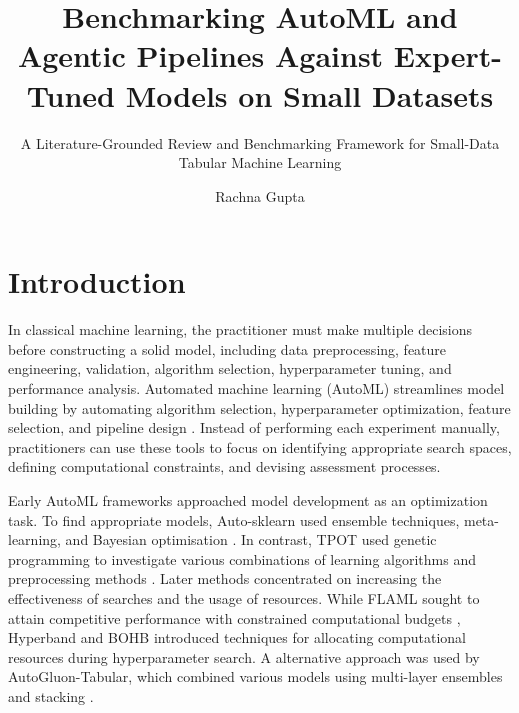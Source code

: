 \documentclass[acmsmall,screen]{acmart}
\title{Benchmarking AutoML and Agentic Pipelines Against Expert-Tuned Models on Small Datasets}
\subtitle{A Literature-Grounded Review and Benchmarking Framework for Small-Data Tabular Machine Learning}
\author{Rachna Gupta}
\affiliation{\institution{AI Tools for Research}\city{Prayagraj}\country{India}}
\begin{document}
\maketitle

\section{Introduction}\label{sec:intro}



In classical machine learning, the practitioner must make multiple decisions before constructing a solid model, including data preprocessing, feature engineering, validation, algorithm selection, hyperparameter tuning, and performance analysis. Automated machine learning (AutoML) streamlines model building by automating algorithm selection, hyperparameter optimization, feature selection, and pipeline design \cite{feurer2015,olson2016}. Instead of performing each experiment manually, practitioners can use these tools to focus on identifying appropriate search spaces, defining computational constraints, and devising assessment processes.


Early AutoML frameworks approached model development as an optimization task. To find appropriate models, Auto-sklearn used ensemble techniques, meta-learning, and Bayesian optimisation \cite{feurer2015}. In contrast, TPOT used genetic programming to investigate various combinations of learning algorithms and preprocessing methods \cite{olson2016}. Later methods concentrated on increasing the effectiveness of searches and the usage of resources. While FLAML sought to attain competitive performance with constrained computational budgets \cite{wang2021}, Hyperband \cite{li2018} and BOHB \cite{falkner2018} introduced techniques for allocating computational resources during hyperparameter search. A alternative approach was used by AutoGluon-Tabular, which combined various models using multi-layer ensembles and stacking \cite{erickson2020}.
\end{document}
